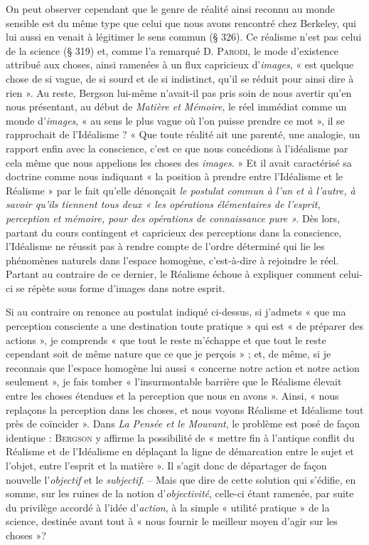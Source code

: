On peut observer cependant que le genre de réalité ainsi reconnu
au monde sensible est du même type que celui que nous avons rencontré
chez Berkeley, qui lui aussi en venait à légitimer le sens
commun (§ 326). Ce réalisme n’est pas celui de la science (§ 319) et,
comme l’a remarqué D. \textsc{Parodi}, le mode d’existence attribué aux
choses, ainsi ramenées à un flux capricieux d'{\it images}, « est quelque chose
de si vague, de si sourd et de si indistinct, qu’il se réduit pour ainsi
dire à rien ». Au reste, Bergson lui-même n’avait-il pas pris soin de
nous avertir qu’en nous présentant, au début de {\it Matière et Mémoire},
le réel immédiat comme un monde d'{\it images}, « au sens le plus vague
où l’on puisse prendre ce mot », il se rapprochait de l’Idéalisme ?
« Que toute réalité ait une parenté, une analogie, un rapport enfin
avec la conscience, c’est ce que nous concédions à l’idéalisme par cela
même que nous appelions les choses des {\it images}. » Et il avait caractérisé
sa doctrine comme nous indiquant « la position à prendre entre
l’Idéalisme et le Réalisme » par le fait qu’elle dénonçait {\it le postulat
commun à l’un et à l’autre, à savoir qu’ils tiennent tous deux « les opérations
élémentaires de l'esprit, perception et mémoire, pour des opérations
de connaissance pure ».} Dès lors, partant du cours contingent et capricieux
des perceptions dans la conscience, l’Idéalisme ne réussit pas
à rendre compte de l’ordre déterminé qui lie les phénomènes naturels
dans l’espace homogène, c’est-à-dire à rejoindre le réel. Partant au
contraire de ce dernier, le Réalisme échoue à expliquer comment
celui-ci se répète sous forme d’images dans notre esprit.

Si au contraire on renonce au postulat indiqué ci-dessus, si j’admets
« que ma perception consciente a une destination toute pratique »
qui est « de préparer des actions », je comprends « que tout le reste
m’échappe et que tout le reste cependant soit de même nature que
ce que je perçois » ; et, de même, si je reconnais que l’espace homogène
lui aussi « concerne notre action et notre action seulement », je fais
tomber « l’insurmontable barrière que le Réalisme élevait entre les
choses étendues et la perception que nous en avons ». Ainsi, « nous
replaçons la perception dans les choses, et nous voyons Réalisme et
Idéalisme tout près de coïncider ». Dans {\it La Pensée et le Mouvant}, le
problème est posé de façon identique : \textsc{Bergson} y affirme la possibilité
de « mettre fin à l'antique conflit du Réalisme et de l’Idéalisme
en déplaçant la ligne de démarcation entre le sujet et l’objet, entre
l'esprit et la matière ». Il s’agit donc de départager de façon nouvelle
l'{\it objectif} et le {\it subjectif}. -- Mais que dire de cette solution qui s’édifie,
en somme, sur les ruines de la notion d’{\it objectivité}, celle-ci étant ramenée,
par suite du privilège accordé à l’idée d'{\it action}, à la simple « utilité
pratique » de la science, destinée avant tout à « nous fournir le meilleur
moyen d’agir sur les choses »?

